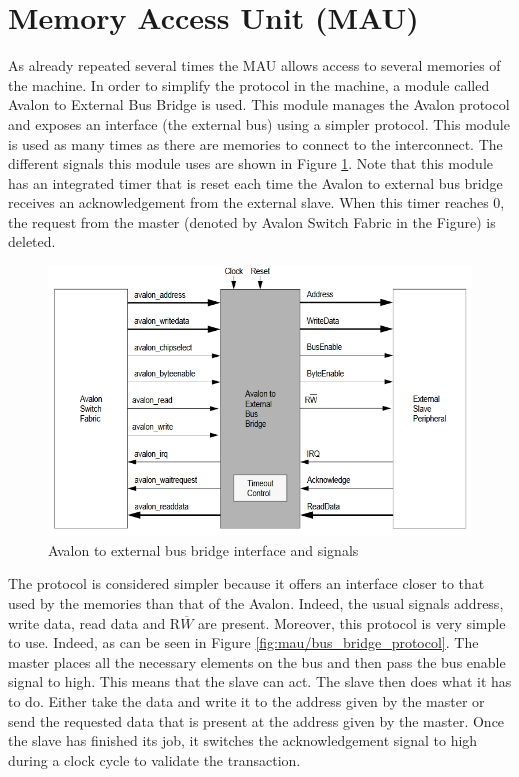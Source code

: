\section{Memory Access Unit (MAU)}

As already repeated several times the MAU allows access to several memories of the machine. In order 
to simplify the protocol in the machine, a module called Avalon to External Bus Bridge is used. This 
module manages the Avalon protocol and exposes an interface (the external bus) using a simpler 
protocol. This module is used as many times as there are memories to connect to the interconnect.
The different signals this module uses are shown in Figure \ref{fig:mau/bus_bridge}. Note that this
module has an integrated timer that is reset each time the Avalon to external bus bridge receives
an acknowledgement from the external slave. When this timer reaches 0, the request from the master 
(denoted by Avalon Switch Fabric in the Figure) is deleted.

\begin{figure}[H]
    \center
    \includegraphics[scale=0.8]{"Chapter4-MAU_CTRLU/res/external_bus_bridge.PNG"}
    \caption{Avalon to external bus bridge interface and signals}
    \label{fig:mau/bus_bridge}
\end{figure}

The protocol is considered simpler because it offers an interface closer to that used by the memories 
than that of the Avalon. Indeed, the usual signals address, write data, read data and R$\overline{W}$ are 
present. Moreover, this protocol is very simple to use. Indeed, as can be seen in Figure \ref{fig:mau/bus_bridge_protocol}. The master 
places all the necessary elements on the bus and then pass the bus enable signal to high. This means 
that the slave can act. The slave then does what it has to do. Either take the data and write it to 
the address given by the master or send the requested data that is present at the address given by 
the master. Once the slave has finished its job, it switches the acknowledgement signal to high 
during a clock cycle to validate the transaction. 

